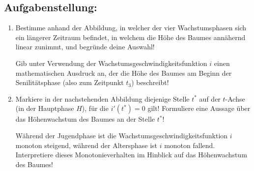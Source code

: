 \begin{langesbeispiel}
\subsection{Aufgabenstellung:}
\begin{enumerate}
	\item Bestimme anhand der Abbildung, in welcher der vier Wachstumsphasen sich ein längerer Zeitraum befindet, in welchem die Höhe des Baumes annähernd linear zunimmt, und begründe deine Auswahl!
	
	Gib unter Verwendung der Wachstumsgeschwindigkeitsfunktion $i$ einen mathematischen Ausdruck an, der die Höhe des Baumes am Beginn der Senilitätsphase (also zum Zeitpunkt $t_3$) beschreibt!
					
\item Markiere in der nachstehenden Abbildung diejenige Stelle $t^*$ auf der $t$-Achse (in der Hauptphase $H$), für die $i'(t^*)=0$ gilt! Formuliere eine Aussage über das Höhenwachstum des Baumes an der Stelle $t^*$!

\begin{center}\end{center}

Während der Jugendphase ist die Wachstumsgeschwindigkeitsfunktion $i$ monoton steigend, während der Altersphase ist $i$ monoton fallend. Interpretiere dieses Monotonieverhalten im Hinblick auf das Höhenwachstum des Baumes!
						\end{enumerate}\leer
				
\end{langesbeispiel}
